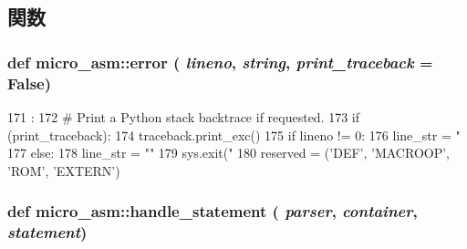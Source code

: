 \subsection{関数}
\hypertarget{namespacemicro__asm_aac1c7ff3716ce006fcaf70d6764ce105}{
\subsubsection[{error}]{\setlength{\rightskip}{0pt plus 5cm}def micro\_\-asm::error ( {\em lineno}, \/   {\em string}, \/   {\em print\_\-traceback} = {\ttfamily False})}}
\label{namespacemicro__asm_aac1c7ff3716ce006fcaf70d6764ce105}



\begin{DoxyCode}
171                                                   :
172     # Print a Python stack backtrace if requested.
173     if (print_traceback):
174         traceback.print_exc()
175     if lineno != 0:
176         line_str = "%
177     else:
178         line_str = ""
179     sys.exit("%
180 
reserved = ('DEF', 'MACROOP', 'ROM', 'EXTERN')
\end{DoxyCode}
\hypertarget{namespacemicro__asm_a1eb3d34a205235b95d352afbdc605c4d}{
\subsubsection[{handle\_\-statement}]{\setlength{\rightskip}{0pt plus 5cm}def micro\_\-asm::handle\_\-statement ( {\em parser}, \/   {\em container}, \/   {\em statement})}}
\label{namespacemicro__asm_a1eb3d34a205235b95d352afbdc605c4d}



